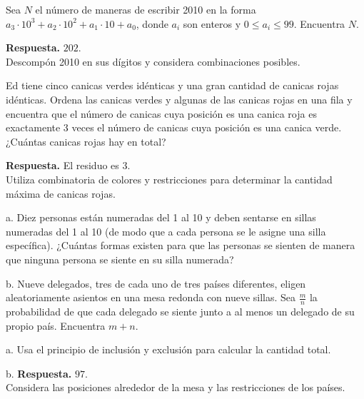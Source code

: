 \documentclass[11pt]{scrartcl}
\begin{document}
\begin{problem}[AIME 2010]
Sea \( N \) el número de maneras de escribir 2010 en la forma \( a_3 \cdot 10^3 + a_2 \cdot 10^2 + a_1 \cdot 10 + a_0 \), donde \( a_i \) son enteros y \( 0 \leq a_i \leq 99 \). Encuentra \( N \).
\begin{hint}
\textbf{Respuesta.} \( 202 \).\\

Descompón 2010 en sus dígitos y considera combinaciones posibles.
\end{hint}
\end{problem}

\begin{problem}[AIME 2011]
Ed tiene cinco canicas verdes idénticas y una gran cantidad de canicas rojas idénticas. Ordena las canicas verdes y algunas de las canicas rojas en una fila y encuentra que el número de canicas cuya posición es una canica roja es exactamente 3 veces el número de canicas cuya posición es una canica verde. ¿Cuántas canicas rojas hay en total?
\begin{hint}
\textbf{Respuesta.} El residuo es \( 3 \).\\

Utiliza combinatoria de colores y restricciones para determinar la cantidad máxima de canicas rojas.
\end{hint}
\end{problem}

\begin{problem}[AIME 2011]
a. Diez personas están numeradas del 1 al 10 y deben sentarse en sillas numeradas del 1 al 10 (de modo que a cada persona se le asigne una silla específica). ¿Cuántas formas existen para que las personas se sienten de manera que ninguna persona se siente en su silla numerada?

b. Nueve delegados, tres de cada uno de tres países diferentes, eligen aleatoriamente asientos en una mesa redonda con nueve sillas. Sea \( \frac{m}{n} \) la probabilidad de que cada delegado se siente junto a al menos un delegado de su propio país. Encuentra \( m + n \).
\begin{hint}
a. Usa el principio de inclusión y exclusión para calcular la cantidad total.

b. \textbf{Respuesta.} \( 97 \).\\
Considera las posiciones alrededor de la mesa y las restricciones de los países.
\end{hint}
\end{problem}
\end{document}
